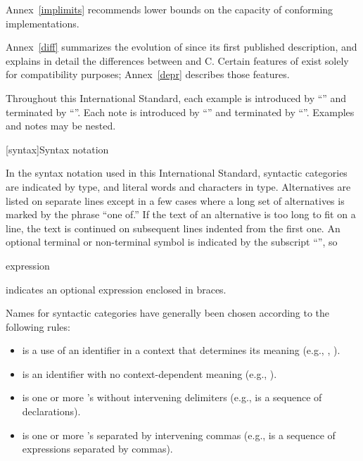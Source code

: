 \pnum
Annex~\ref{implimits} recommends lower bounds on the capacity of conforming
implementations.

\pnum
Annex~\ref{diff} summarizes the evolution of \Cpp  since its first
published description, and explains in detail the differences between
\Cpp  and C. Certain features of \Cpp  exist solely for compatibility
purposes; Annex~\ref{depr} describes those features.

\pnum
Throughout this International Standard, each example is introduced by
``\enterexample'' and terminated by ``\exitexample''. Each note is
introduced by ``\enternote'' and terminated by ``\exitnote''. Examples
and notes may be nested.%

[syntax]{Syntax notation}

\pnum
{}%
In the syntax notation used in this International Standard, syntactic
categories are indicated by  type, and literal words
and characters in   type. Alternatives are
listed on separate lines except in a few cases where a long set of
alternatives is marked by the phrase ``one of.'' If the text of an alternative is too long to fit on a line, the text is continued on subsequent lines indented from the first one.
An optional terminal or non-terminal symbol is indicated by the subscript
``\opt'', so

\begin{ncbnf}
\terminal{\{} expression\opt \terminal{\}}
\end{ncbnf}

indicates an optional expression enclosed in braces.%

\pnum
Names for syntactic categories have generally been chosen according to
the following rules:
\begin{itemize}
\item {} is a use of an identifier in a context that
determines its meaning (e.g., ,
).
\item {} is an identifier with no context-dependent meaning
(e.g., ).
\item {} is one or more 's without intervening
delimiters (e.g.,  is a sequence of
declarations).
\item {} is one or more 's separated by
intervening commas (e.g.,  is a sequence of
expressions separated by commas).
\end{itemize}%

